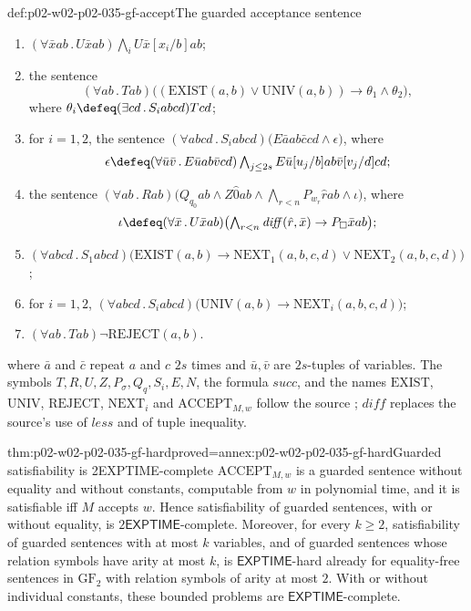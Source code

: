 \begin{hbdefinition}{def:p02-w02-p02-035-gf-accept}{The guarded acceptance sentence}
\begin{enumerate}
\item \((\forall\bar xab\,.\,U\bar xab)\bigwedge_{i}U\bar x[x_i/b]ab\);
\item the sentence
  \[
   (\forall ab\,.\,Tab)\bigl((\mathrm{EXIST}(a,b)\lor\mathrm{UNIV}(a,b))\to
   \theta_1\land\theta_2\bigr),
  \]
  where \(\theta_i\defeq(\exists cd\,.\,S_iabcd)Tcd\);
\item for \(i=1,2\), the sentence
  \((\forall abcd\,.\,S_iabcd)\bigl(E\bar aab\bar ccd\land\epsilon\bigr)\), where
  \[
   \epsilon\defeq(\forall\bar u\bar v\,.\,E\bar uab\bar vcd)
   \textstyle\bigwedge_{j\leq2s}E\bar u[u_j/b]ab\bar v[v_j/d]cd;
  \]
\item the sentence
  \(
   (\forall ab\,.\,Rab)\bigl(Q_{q_0}ab\land Z\hat0ab\land
   \bigwedge_{r<n}P_{w_r}\hat rab\land\iota\bigr)
  \), where
  \[
   \iota\defeq(\forall\bar x\,.\,U\bar xab)
   \bigl(\textstyle\bigwedge_{r<n}\mathit{diff}(\hat r,\bar x)\to P_\square\bar xab\bigr);
  \]
\item \((\forall abcd\,.\,S_1abcd)\bigl(\mathrm{EXIST}(a,b)\to
  \mathrm{NEXT}_1(a,b,c,d)\lor\mathrm{NEXT}_2(a,b,c,d)\bigr)\);
\item for \(i=1,2\), \((\forall abcd\,.\,S_iabcd)
  \bigl(\mathrm{UNIV}(a,b)\to\mathrm{NEXT}_i(a,b,c,d)\bigr)\);
\item \((\forall ab\,.\,Tab)\neg\mathrm{REJECT}(a,b)\).
\end{enumerate}
where \(\bar a\) and \(\bar c\) repeat \(a\) and \(c\) \(2s\) times and
\(\bar u,\bar v\) are \(2s\)-tuples of variables.  The symbols \(T,R,U,Z,
P_\sigma,Q_q,S_i,E,N\), the formula \(\mathit{succ}\),
and the names \(\mathrm{EXIST}\), \(\mathrm{UNIV}\), \(\mathrm{REJECT}\),
\(\mathrm{NEXT}_i\) and \(\mathrm{ACCEPT}_{M,w}\) follow the source
\cite[proof of thm.~4.4]{Gradel1999}; \(\mathit{diff}\) replaces the source's
use of \(\mathit{less}\) and of tuple inequality.
\end{hbdefinition}

\begin{hbtheorem}{thm:p02-w02-p02-035-gf-hard}{proved=annex:p02-w02-p02-035-gf-hard}{Guarded satisfiability is 2EXPTIME-complete}
\(\mathrm{ACCEPT}_{M,w}\) is a guarded sentence without equality and without
constants, computable from \(w\) in polynomial time, and it is satisfiable
iff \(M\) accepts \(w\).  Hence satisfiability of guarded sentences, with or
without equality, is \(2\mathsf{EXPTIME}\)-complete.  Moreover, for every
\(k\geq2\), satisfiability of guarded sentences with at most \(k\) variables,
and of guarded sentences whose relation symbols have arity at most \(k\), is
\(\mathsf{EXPTIME}\)-hard already for equality-free sentences in
\(\mathrm{GF}_2\) with relation symbols of arity at most \(2\).  With or
without individual constants, these bounded problems are
\(\mathsf{EXPTIME}\)-complete.
\end{hbtheorem}

